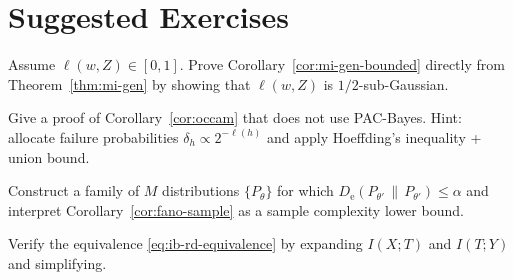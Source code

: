 \documentclass{article}
\numberwithin{equation}{section}
\newcommand{\KLnat}[2]{D_{\mathrm{e}}\!\left(#2\,\middle\|\,#2\right)}
\begin{document}
\section*{Suggested Exercises}
\begin{exercise}
Assume $\ell(w,Z)\in[0,1]$.
Prove Corollary~\ref{cor:mi-gen-bounded} directly from Theorem~\ref{thm:mi-gen} by showing that $\ell(w,Z)$ is $1/2$-sub-Gaussian.
\end{exercise}

\begin{exercise}
Give a proof of Corollary~\ref{cor:occam} that does not use PAC-Bayes.
Hint: allocate failure probabilities $\delta_h\propto 2^{-\ell(h)}$ and apply Hoeffding's inequality + union bound.
\end{exercise}

\begin{exercise}
Construct a family of $M$ distributions $\{P_\theta\}$ for which $\KLnat{P_\theta}{P_{\theta'}}\le \alpha$ and interpret Corollary~\ref{cor:fano-sample} as a sample complexity lower bound.
\end{exercise}

\begin{exercise}[IB as RD]
Verify the equivalence \eqref{eq:ib-rd-equivalence} by expanding $I(X;T)$ and $I(T;Y)$ and simplifying.
\end{exercise}
\end{document}
